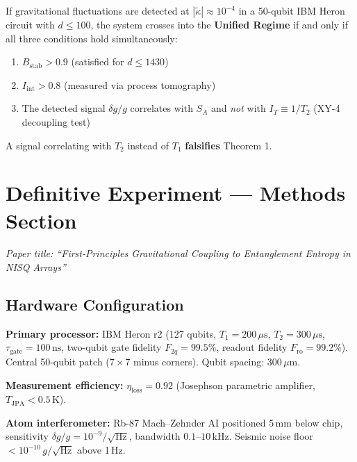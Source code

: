 \documentclass[11pt,letterpaper]{article}
\newcommand{\SA}{S_A}
\newcommand{\Bstab}{B_{\mathrm{stab}}}
\newcommand{\tgate}{\tau_{\mathrm{gate}}}
\begin{document}
\begin{theorembox}
If gravitational fluctuations are detected at $|\tilde{\kappa}| \approx 10^{-4}$ in a 50-qubit IBM Heron circuit with $d \leq 100$, the system crosses into the \textbf{Unified Regime} if and only if all three conditions hold simultaneously:
\begin{enumerate}[nosep]
  \item $\Bstab > 0.9$ (satisfied for $d \leq 1430$)
  \item $I_{\mathrm{int}} > 0.8$ (measured via process tomography)
  \item The detected signal $\delta g/g$ correlates with $\SA$ and \emph{not} with $I_T \equiv 1/T_2$ (XY-4 decoupling test)
\end{enumerate}
A signal correlating with $T_2$ instead of $T_1$ \textbf{falsifies} Theorem 1.
\end{theorembox}

\newpage
\section{Definitive Experiment --- Methods Section}

\textit{Paper title: ``First-Principles Gravitational Coupling to Entanglement Entropy in NISQ Arrays''}

\subsection{Hardware Configuration}

\textbf{Primary processor:} IBM Heron r2 (127 qubits, $T_1 = 200\,\mu\text{s}$, $T_2 = 300\,\mu\text{s}$, $\tgate = 100\,\text{ns}$, two-qubit gate fidelity $F_{2q} = 99.5\%$, readout fidelity $F_{\mathrm{ro}} = 99.2\%$). Central 50-qubit patch ($7\times 7$ minus corners). Qubit spacing: $300\,\mu\text{m}$.

\textbf{Measurement efficiency:} $\eta_{\mathrm{loss}} = 0.92$ (Josephson parametric amplifier, $T_{\mathrm{JPA}} < 0.5\,\text{K}$).

\textbf{Atom interferometer:} Rb-87 Mach--Zehnder AI positioned 5\,mm below chip, sensitivity $\delta g/g = 10^{-9}/\sqrt{\text{Hz}}$, bandwidth $0.1$--$10\,\text{kHz}$. Seismic noise floor $< 10^{-10}\,g/\sqrt{\text{Hz}}$ above 1\,Hz.
\end{document}
